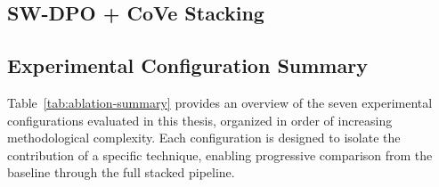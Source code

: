 \documentclass[12pt,a4paper,oneside]{report}
\begin{document}
%

\subsection{SW-DPO + CoVe Stacking}
\label{subsec:stacking}

\subsection{Experimental Configuration Summary}
\label{subsec:ablation-summary}

Table~\ref{tab:ablation-summary} provides an overview of the seven experimental configurations evaluated in this thesis, organized in order of increasing methodological complexity. Each configuration is designed to isolate the contribution of a specific technique, enabling progressive comparison from the baseline through the full stacked pipeline.
\end{document}
